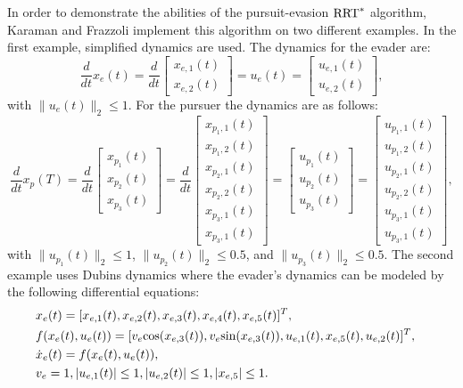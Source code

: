 In order to demonstrate the abilities of the pursuit-evasion $\textnormal{RRT}^*$ algorithm, Karaman and Frazzoli implement this algorithm on two different examples. In the first example, simplified dynamics are used. The dynamics for the evader are:
\begin{equation*}
\dfrac{d}{dt}x_e(t) = \dfrac{d}{dt}\left[ \begin{array}{c}
x_{e,1}(t) \\
x_{e,2}(t) \end{array} \right] = u_e(t) = \left[ \begin{array}{c}
u_{e,1}(t) \\
u_{e,2}(t) \end{array} \right],
\end{equation*}
with $\|u_e(t)\|_2 \leq 1$. For the pursuer the dynamics are as follows:
\begin{equation*}
\dfrac{d}{dt}x_p(T) = \dfrac{d}{dt}\left[ \begin{array}{c}
x_{p_1}(t) \\
x_{p_2}(t) \\
x_{p_3}(t) \end{array} \right] = \dfrac{d}{dt}\left[ \begin{array}{c}
x_{p_1,1}(t) \\
x_{p_1,2}(t) \\
x_{p_2,1}(t) \\
x_{p_2,2}(t) \\
x_{p_3,1}(t) \\
x_{p_3,1}(t) \end{array} \right] =
\left[ \begin{array}{c}
u_{p_1}(t) \\
u_{p_2}(t) \\
u_{p_3}(t) \end{array} \right] = \left[ \begin{array}{c}
u_{p_1,1}(t) \\
u_{p_1,2}(t) \\
u_{p_2,1}(t) \\
u_{p_2,2}(t) \\
u_{p_3,1}(t) \\
u_{p_3,1}(t) \end{array} \right],
\end{equation*}                   
with $\|u_{p_1}(t)\|_2 \leq 1$, $\|u_{p_2}(t)\|_2 \leq 0.5$, and $\|u_{p_3}(t)\|_2 \leq 0.5$. The second example uses Dubins dynamics where the evader's dynamics can be modeled by the following differential equations:
\begin{align*}
& x_e(t) = [x_{e,1}(t),x_{e,2}(t),x_{e,3}(t),x_{e,4}(t),x_{e,5}(t)]^T , & \\
& f(x_e(t),u_e(t)) = [v_e \textnormal{cos}(x_{e,3}(t)),v_e \textnormal{sin}(x_{e,3}(t)),u_{e,1}(t),x_{e,5}(t),u_{e,2}(t)]^T , &\\
& \dot{x}_e(t) = f(x_e(t),u_e(t)), & \\
& v_e = 1, |u_{e,1}(t)| \leq 1, |u_{e,2}(t)| \leq 1, |x_{e,5}| \leq 1. &
\end{align*} 
